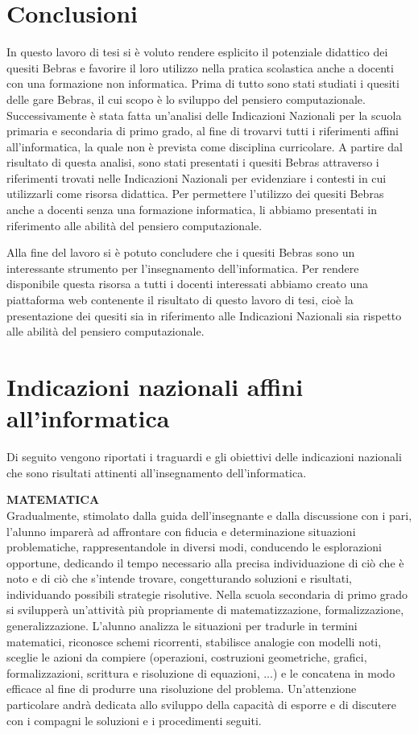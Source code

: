 \documentclass[12pt]{report}
\begin{document}
\chapter*{Conclusioni}

In questo lavoro di tesi si è voluto rendere esplicito il potenziale didattico dei quesiti Bebras e favorire il loro utilizzo nella pratica scolastica anche a docenti con una formazione non informatica.
Prima di tutto sono stati studiati i quesiti delle gare Bebras, il cui scopo è lo sviluppo del pensiero computazionale. 
Successivamente è stata fatta un'analisi delle Indicazioni Nazionali per la scuola primaria e secondaria di primo grado, al fine di trovarvi tutti i riferimenti affini all'informatica, la quale non è prevista come disciplina curricolare.
A partire dal risultato di questa analisi, sono stati presentati i quesiti Bebras attraverso i riferimenti trovati nelle Indicazioni Nazionali per evidenziare i contesti in cui utilizzarli come risorsa didattica.
Per permettere l'utilizzo dei quesiti Bebras anche a docenti senza una formazione informatica, li abbiamo presentati in riferimento alle abilità del pensiero computazionale.

Alla fine del lavoro si è potuto concludere che i quesiti Bebras sono un interessante strumento per l'insegnamento dell'informatica. Per rendere disponibile questa risorsa a tutti i docenti interessati abbiamo creato una piattaforma web contenente il risultato di questo lavoro di tesi, cioè la presentazione dei quesiti sia in riferimento alle Indicazioni Nazionali sia rispetto alle abilità del pensiero computazionale.
\appendix

\chapter{Indicazioni nazionali affini all'informatica} \label{ElencoIndicazioni}
Di seguito vengono riportati i traguardi e gli obiettivi delle indicazioni nazionali \cite{indicazioniNazionali} che sono risultati attinenti all'insegnamento dell'informatica.

\bigskip
\noindent \textbf{MATEMATICA}
\\
Gradualmente, stimolato dalla guida dell'insegnante e dalla discussione con i pari, l’alunno imparerà ad affrontare con fiducia e determinazione situazioni problematiche, rappresentandole in diversi modi, conducendo le esplorazioni opportune, dedicando il tempo necessario alla precisa individuazione di ciò che è noto e di ciò che s'intende trovare, congetturando soluzioni e risultati, individuando possibili strategie risolutive. Nella scuola secondaria di primo grado si svilupperà un'attività più propriamente di matematizzazione, formalizzazione, generalizzazione.
L'alunno analizza le situazioni per tradurle in termini matematici, riconosce schemi ricorrenti, stabilisce analogie con modelli noti, sceglie le azioni da compiere (operazioni, costruzioni geometriche, grafici, formalizzazioni, scrittura e risoluzione di equazioni, ...) e le concatena in modo efficace al fine di produrre una risoluzione del problema. Un’attenzione particolare andrà dedicata allo sviluppo della capacità di esporre e di discutere con i compagni le soluzioni e i procedimenti seguiti.
\end{document}
